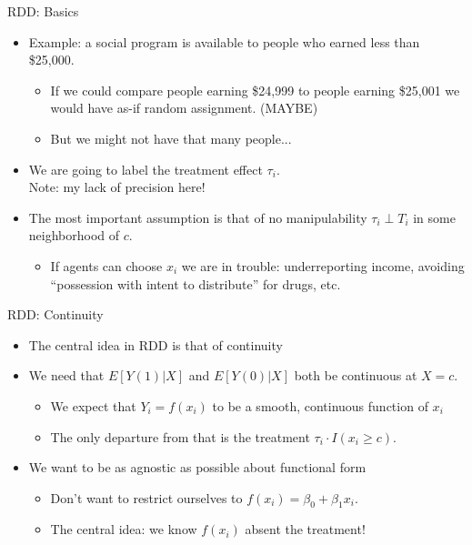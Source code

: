 \documentclass[xcolor=pdftex,dvipsnames,table,mathserif,aspectratio=169]{beamer}
\begin{document}
\begin{frame}{RDD: Basics}
\begin{itemize}
\item Example: a social program is available to people who earned less than \$25,000.
\begin{itemize}              
\item If we could compare people earning \$24,999 to people earning \$25,001 we would have as-if random assignment. (MAYBE)
\item But we might not have that many people...
\end{itemize}
\item We are going to label the \alert{treatment effect} $\tau_i$.\\
Note: my lack of precision here!
\item The most important assumption is that of \alert{no manipulability} $\tau_i  \perp T_i$ in some neighborhood of $c$.
\begin{itemize}
\item If agents can \alert{choose} $x_i$ we are in trouble: underreporting income, avoiding ``possession with intent to distribute'' for drugs, etc.
\end{itemize}              
\end{itemize}              
\end{frame}


\begin{frame}{RDD: Continuity}
\begin{itemize}
\item The central idea in RDD is that of \alert{continuity}
\item We need that $E[Y(1)  | X]$ and $E[Y(0) | X]$ both be continuous at $X=c$.
\begin{itemize}
\item We expect that $Y_i = f(x_i)$ to be a smooth, continuous function of $x_i$
\item The \alert{only} departure from that is the treatment $\tau_i \cdot I(x_i \geq c)$.
\end{itemize}
\item We want to be as agnostic as possible about \alert{functional form}
\begin{itemize}
\item Don't want to restrict ourselves to $f(x_i) = \beta_0 + \beta_1 x_i$.
\item The central idea: we know $f(x_i)$ absent the treatment!
\end{itemize}   
\end{itemize}              
\end{frame}
\end{document}

